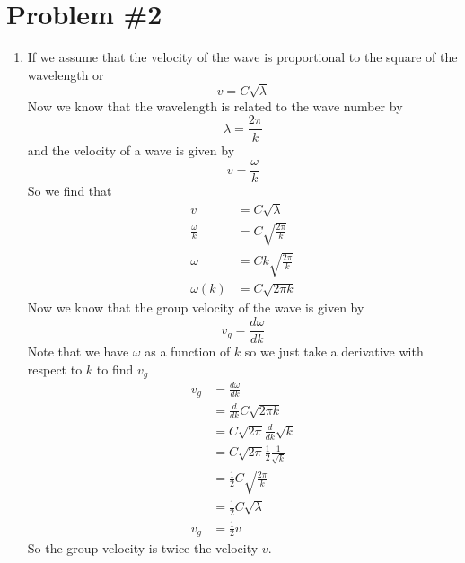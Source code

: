 \documentclass[11pt]{article}
\numberwithin{equation}{section}
\begin{document}
\section{Problem \#2}
\begin{enumerate}
\item
If we assume that the velocity of the wave is proportional to the square of the wavelength or
$$v = C\sqrt{\lambda}$$
Now we know that the wavelength is related to the wave number by
$$\lambda = \frac{2\pi}{k}$$
and the velocity of a wave is given by
$$v = \frac{\omega}{k}$$
So we find that
\begin{align*}
v &= C\sqrt{\lambda}\\
\frac{\omega}{k} &= C\sqrt{\frac{2\pi}{k}}\\
\omega &= Ck\sqrt{\frac{2\pi}{k}}\\
\omega(k) &= C\sqrt{2\pi k}
\end{align*}
Now we know that the group velocity of the wave is given by
$$v_g = \frac{d\omega}{dk}$$ 
Note that we have $\omega$ as a function of $k$ so we just take a derivative with respect to $k$ to find $v_g$
\begin{align*}
v_g &= \frac{d\omega}{dk}\\
&= \frac{d}{dk}C\sqrt{2\pi k}\\
&= C\sqrt{2\pi}\frac{d}{dk}\sqrt{k}\\
&= C\sqrt{2\pi}\frac{1}{2}\frac{1}{\sqrt{k}}\\
&= \frac{1}{2}C\sqrt{\frac{2\pi}{k}}\\
&= \frac{1}{2}C\sqrt{\lambda}\\
v_g &= \frac{1}{2}v
\end{align*}
So the group velocity is twice the velocity $v$.


\end{enumerate}
\end{document}
